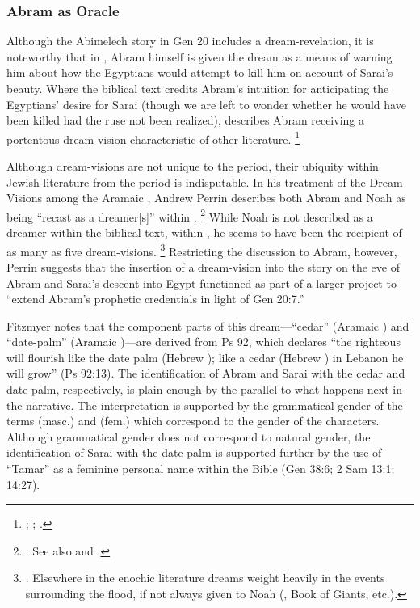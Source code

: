 \subsubsection{Abram as Oracle}
Although the Abimelech story in Gen 20 includes a dream-revelation, it is noteworthy that in \ga, Abram himself is given the dream as a means of warning him about how the Egyptians would attempt to kill him on account of Sarai's beauty. Where the biblical text credits Abram's intuition for anticipating the Egyptians' desire for Sarai (though we are left to wonder whether he would have been killed had the ruse not been realized), \ga describes Abram receiving a portentous dream vision characteristic of other \secondtemple literature.%
    \footnote{\Cite{gevirtz_maarav1992}; \cite[184]{fitzmyer2004}; \cite{dacy_tzoref2013}.}

Although dream-visions are not unique to the \secondtemple period, their ubiquity within Jewish literature from the \secondtemple period is indisputable. In his treatment of the Dream-Visions among the Aramaic \dss, Andrew Perrin describes both Abram and Noah as being ``recast as a dreamer[s]'' within \ga.%
    \footnote{\Cite[52--57]{perrin2015}. See also 
        \cite{eshel_klostergaard-etal2009} and 
        \cite{machiela_falk-etal2010}.}
While Noah is not described as a dreamer within the biblical text, within \ga, he seems to have been the recipient of as many as five dream-visions.%
    \footnote{\Cite[53]{perrin2015}. Elsewhere in the enochic literature dreams weight heavily in the events surrounding the flood, if not always given to Noah (\firstenoch, Book of Giants, etc.).}
Restricting the discussion to Abram, however, Perrin suggests that the insertion of a dream-vision into the story on the eve of Abram and Sarai's descent into Egypt functioned as part of a larger project to ``extend Abram's prophetic credentials in light of Gen 20:7.''%
    \autocite[55]{perrin2015} 

Fitzmyer notes that the component parts of this dream---``cedar'' (Aramaic ) and ``date-palm'' (Aramaic )---are derived from Ps 92, which declares ``the righteous will flourish like the date palm (Hebrew ); like a cedar (Hebrew ) in Lebanon he will grow'' (Ps 92:13). The identification of Abram and Sarai with the cedar and date-palm, respectively, is plain enough by the parallel to what happens next in the narrative. The interpretation is supported by the grammatical gender of the terms  (masc.) and  (fem.) which correspond to the gender of the characters. Although grammatical gender does not correspond to natural gender, the identification of Sarai with the date-palm is supported further by the use of ``Tamar'' as a feminine personal name within the Bible (Gen 38:6; 2 Sam 13:1; 14:27).

